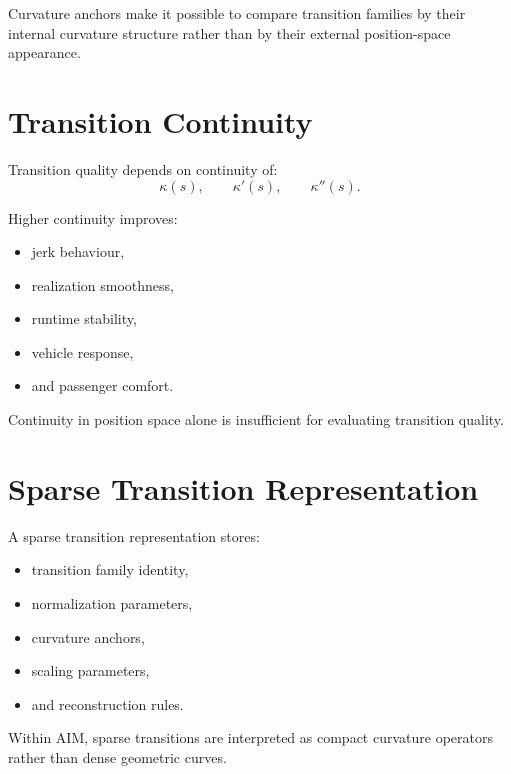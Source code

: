 Curvature anchors make it possible to compare transition families by
their internal curvature structure rather than by their external
position-space appearance.

\section{Transition Continuity}

\begin{definition}
\label{def:transition-continuity}
Transition quality depends on continuity of:
\[
\kappa(s),
\qquad
\kappa'(s),
\qquad
\kappa''(s).
\]
\end{definition}

Higher continuity improves:
\begin{itemize}
\item jerk behaviour,
\item realization smoothness,
\item runtime stability,
\item vehicle response,
\item and passenger comfort.
\end{itemize}

Continuity in position space alone is insufficient for evaluating
transition quality.

\section{Sparse Transition Representation}

\begin{definition}
\label{def:sparse-transition}
A sparse transition representation stores:
\begin{itemize}
\item transition family identity,
\item normalization parameters,
\item curvature anchors,
\item scaling parameters,
\item and reconstruction rules.
\end{itemize}
\end{definition}

Within AIM, sparse transitions are interpreted as compact curvature
operators rather than dense geometric curves.

